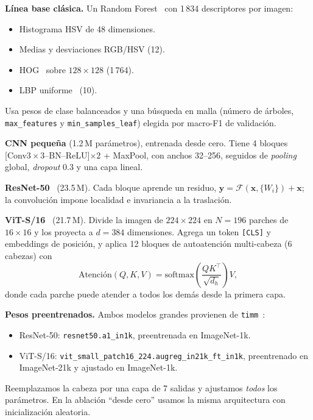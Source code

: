 \documentclass[conference,a4paper]{IEEEtran}
\begin{document}
\textbf{Línea base clásica.} Un Random Forest~\cite{breiman2001rf} con 1\,834 descriptores por imagen:
\begin{itemize}
\item Histograma HSV de 48 dimensiones.
\item Medias y desviaciones RGB/HSV (12).
\item HOG~\cite{dalal2005hog} sobre $128\times128$ (1\,764).
\item LBP uniforme~\cite{ojala2002lbp} (10).
\end{itemize}
Usa pesos de clase balanceados y una búsqueda en malla (número de árboles, \texttt{max\_features} y \texttt{min\_samples\_leaf}) elegida por macro-F1 de validación.

\textbf{CNN pequeña} (1.2\,M parámetros), entrenada desde cero. Tiene 4 bloques [Conv$3{\times}3$--BN--ReLU]$\times2$ + MaxPool, con anchos 32--256, seguidos de \textit{pooling} global, \textit{dropout} 0.3 y una capa lineal.

\textbf{ResNet-50}~\cite{he2016resnet} (23.5\,M). Cada bloque aprende un residuo, $\mathbf{y}=\mathcal{F}(\mathbf{x},\{W_i\})+\mathbf{x}$; la convolución impone localidad e invariancia a la traslación.

\textbf{ViT-S/16}~\cite{dosovitskiy2021vit} (21.7\,M). Divide la imagen de $224\times224$ en $N=196$ parches de $16\times16$ y los proyecta a $d=384$ dimensiones. Agrega un token \texttt{[CLS]} y embeddings de posición, y aplica 12 bloques de autoatención multi-cabeza (6 cabezas) con
\begin{equation}
\text{Atención}(Q,K,V)=\mathrm{softmax}\!\left(\frac{QK^\top}{\sqrt{d_h}}\right)V,
\end{equation}
donde cada parche puede atender a todos los demás desde la primera capa.

\textbf{Pesos preentrenados.} Ambos modelos grandes provienen de \texttt{timm}~\cite{wightman2019timm}:
\begin{itemize}
\item ResNet-50: \texttt{resnet50.a1\_in1k}, preentrenada en ImageNet-1k.
\item ViT-S/16: \texttt{vit\_small\_patch16\_224.}\allowbreak\texttt{augreg\_in21k\_ft\_in1k}, preentrenado en ImageNet-21k y ajustado en ImageNet-1k.
\end{itemize}
Reemplazamos la cabeza por una capa de 7 salidas y ajustamos \emph{todos} los parámetros. En la ablación ``desde cero'' usamos la misma arquitectura con inicialización aleatoria.
\end{document}
